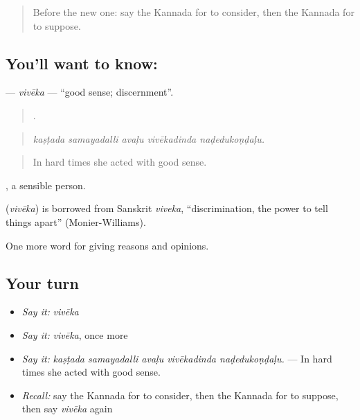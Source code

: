 \label{lesson:KA-C381-viveka}



\begin{quote}
Before the new one: say the Kannada for to consider, then the Kannada for to suppose.
\end{quote}

\subsection*{You'll want to know: }
\textbf{} — \emph{vivēka} — \textquotedblleft{}good sense; discernment\textquotedblright{}.

\begin{quote}
    .
\end{quote}

\begin{quote}
\emph{kaṣṭada samayadalli avaḷu vivēkadinda naḍedukoṇḍaḷu.}
\end{quote}

\begin{quote}
In hard times she acted with good sense.
\end{quote}

, a sensible person.

\begin{cousinweb}
\textbf{} (\emph{vivēka}) is borrowed from Sanskrit \emph{viveka}, \textquotedblleft{}discrimination, the power to tell things apart\textquotedblright{} (Monier-Williams).
\end{cousinweb}

\begin{grammarlens}[title={What you've built}]
One more word for giving reasons and opinions.
\end{grammarlens}

\subsection*{Your turn}
\begin{itemize}
\raggedright
  \item \emph{Say it:} \emph{vivēka}
  \item \emph{Say it:} \emph{vivēka}, once more
  \item \emph{Say it:} \emph{kaṣṭada samayadalli avaḷu vivēkadinda naḍedukoṇḍaḷu.} — In hard times she acted with good sense.
  \item \emph{Recall:} say the Kannada for to consider, then the Kannada for to suppose, then say \emph{vivēka} again
\end{itemize}

